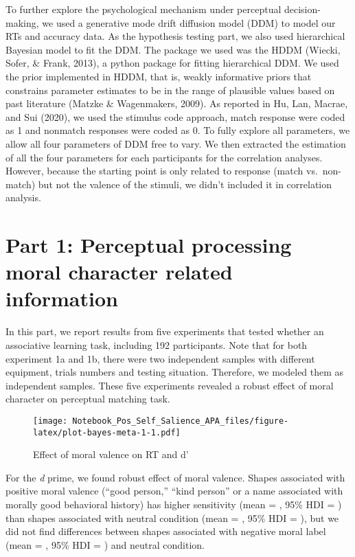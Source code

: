 \documentclass[
  english,
  man]{apa6}
\begin{document}
To further explore the psychological mechanism under perceptual decision-making, we used a generative mode drift diffusion model (DDM) to model our RTs and accuracy data. As the hypothesis testing part, we also used hierarchical Bayesian model to fit the DDM. The package we used was the HDDM (Wiecki, Sofer, \& Frank, 2013), a python package for fitting hierarchical DDM. We used the prior implemented in HDDM, that is, weakly informative priors that constrains parameter estimates to be in the range of plausible values based on past literature (Matzke \& Wagenmakers, 2009). As reported in Hu, Lan, Macrae, and Sui (2020), we used the stimulus code approach, match response were coded as 1 and nonmatch responses were coded as 0. To fully explore all parameters, we allow all four parameters of DDM free to vary. We then extracted the estimation of all the four parameters for each participants for the correlation analyses. However, because the starting point is only related to response (match vs.~non-match) but not the valence of the stimuli, we didn't included it in correlation analysis.

\hypertarget{part-1-perceptual-processing-moral-character-related-information}{%
\section{Part 1: Perceptual processing moral character related information}\label{part-1-perceptual-processing-moral-character-related-information}}

In this part, we report results from five experiments that tested whether an associative learning task, including 192 participants. Note that for both experiment 1a and 1b, there were two independent samples with different equipment, trials numbers and testing situation. Therefore, we modeled them as independent samples. These five experiments revealed a robust effect of moral character on perceptual matching task.

\begin{figure}
\centering
\texttt{[image: Notebook\_Pos\_Self\_Salience\_APA\_files/figure-latex/plot-bayes-meta-1-1.pdf]}
\caption{\label{fig:plot-bayes-meta-1}Effect of moral valence on RT and d'}
\end{figure}

For the \emph{d} prime, we found robust effect of moral valence. Shapes associated with positive moral valence (``good person,'' ``kind person'' or a name associated with morally good behavioral history) has higher sensitivity (mean = , 95\% HDI = ) than shapes associated with neutral condition (mean = , 95\% HDI = ), but we did not find differences between shapes associated with negative moral label (mean = , 95\% HDI = ) and neutral condition.
\end{document}

